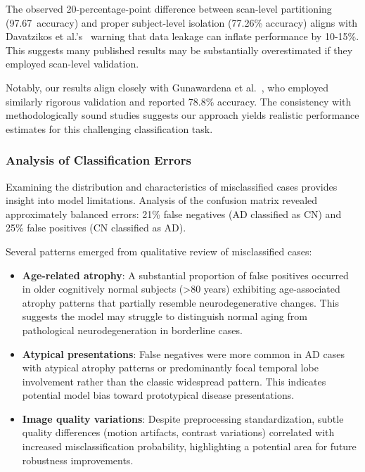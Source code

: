 \documentclass[12pt, a4paper]{article}
\begin{document}
The observed 20-percentage-point difference between scan-level partitioning (97.67\ accuracy) and proper subject-level isolation (77.26\% accuracy) aligns with Davatzikos et al.'s~\cite{davatzikos2019machine} warning that data leakage can inflate performance by 10-15\%. This suggests many published results may be substantially overestimated if they employed scan-level validation.

Notably, our results align closely with Gunawardena et al.~\cite{gunawardena2017applying}, who employed similarly rigorous validation and reported 78.8\% accuracy. The consistency with methodologically sound studies suggests our approach yields realistic performance estimates for this challenging classification task.

\subsubsection{Analysis of Classification Errors}

Examining the distribution and characteristics of misclassified cases provides insight into model limitations. Analysis of the confusion matrix revealed approximately balanced errors: 21\% false negatives (AD classified as CN) and 25\% false positives (CN classified as AD).

Several patterns emerged from qualitative review of misclassified cases:

\begin{itemize}
    \item \textbf{Age-related atrophy}: A substantial proportion of false positives occurred in older cognitively normal subjects (>80 years) exhibiting age-associated atrophy patterns that partially resemble neurodegenerative changes. This suggests the model may struggle to distinguish normal aging from pathological neurodegeneration in borderline cases.
    
    \item \textbf{Atypical presentations}: False negatives were more common in AD cases with atypical atrophy patterns or predominantly focal temporal lobe involvement rather than the classic widespread pattern. This indicates potential model bias toward prototypical disease presentations.
    
    \item \textbf{Image quality variations}: Despite preprocessing standardization, subtle quality differences (motion artifacts, contrast variations) correlated with increased misclassification probability, highlighting a potential area for future robustness improvements.
\end{itemize}
\end{document}
